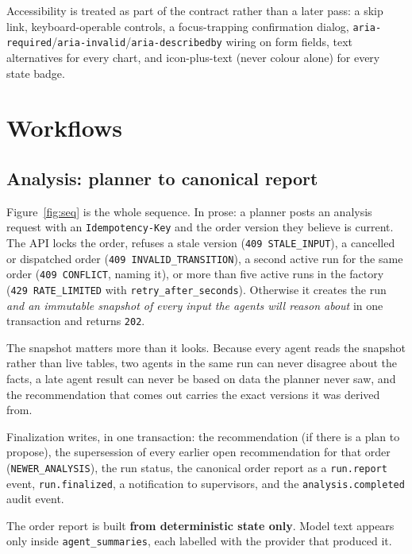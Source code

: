 \documentclass[11pt,a4paper]{article}
\begin{document}
Accessibility is treated as part of the contract rather than a later pass: a
skip link, keyboard-operable controls, a focus-trapping confirmation dialog,
\texttt{aria-required}/\texttt{aria-invalid}/\texttt{aria-describedby} wiring on
form fields, text alternatives for every chart, and icon-plus-text (never colour
alone) for every state badge.

\section{Workflows}

\subsection{Analysis: planner to canonical report}

Figure~\ref{fig:seq} is the whole sequence. In prose: a planner posts an
analysis request with an \texttt{Idempotency-Key} and the order version they
believe is current. The API locks the order, refuses a stale version
(\texttt{409 STALE\_INPUT}), a cancelled or dispatched order
(\texttt{409 INVALID\_TRANSITION}), a second active run for the same order
(\texttt{409 CONFLICT}, naming it), or more than five active runs in the factory
(\texttt{429 RATE\_LIMITED} with \texttt{retry\_after\_seconds}). Otherwise it
creates the run \emph{and an immutable snapshot of every input the agents will
reason about} in one transaction and returns \texttt{202}.

The snapshot matters more than it looks. Because every agent reads the snapshot
rather than live tables, two agents in the same run can never disagree about the
facts, a late agent result can never be based on data the planner never saw, and
the recommendation that comes out carries the exact versions it was derived
from.

Finalization writes, in one transaction: the recommendation (if there is a plan
to propose), the supersession of every earlier open recommendation for that
order (\texttt{NEWER\_ANALYSIS}), the run status, the canonical order report as
a \texttt{run.report} event, \texttt{run.finalized}, a notification to
supervisors, and the \texttt{analysis.completed} audit event.

The order report is built \textbf{from deterministic state only}. Model text
appears only inside \texttt{agent\_summaries}, each labelled with the provider
that produced it.
\end{document}
